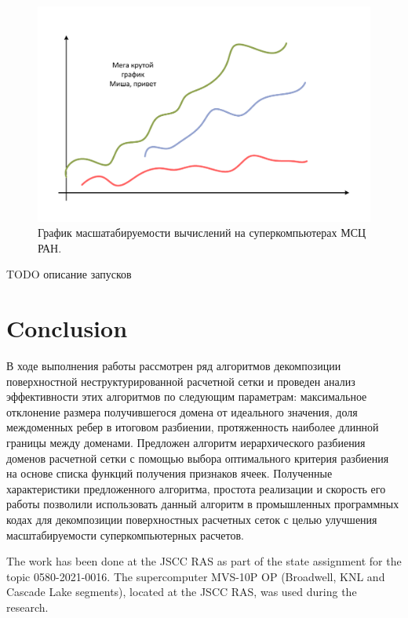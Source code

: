 \documentclass[
11pt,%
tightenlines,%
twoside,%
onecolumn,%
nofloats,%
nobibnotes,%
nofootinbib,%
superscriptaddress,%
noshowpacs,%
centertags]%
{revtex4}
\begin{document}
\begin{figure}[h]
\includegraphics[width=1.0\textwidth]{pics/05-graph.pdf}
\caption{График масшатабируемости вычислений на суперкомпьютерах МСЦ РАН.}\label{fig:05-graph}
\end{figure}

TODO описание запусков

\section{Conclusion}

В ходе выполнения работы рассмотрен ряд алгоритмов декомпозиции поверхностной неструктурированной расчетной сетки и проведен анализ эффективности этих алгоритмов по следующим параметрам: максимальное отклонение размера получившегося домена от идеального значения, доля междоменных ребер в итоговом разбиении, протяженность наиболее длинной границы между доменами. Предложен алгоритм иерархического разбиения доменов расчетной сетки с помощью выбора оптимального критерия разбиения на основе списка функций получения признаков ячеек. Полученные характеристики предложенного алгоритма, простота реализации и скорость его работы позволили использовать данный алгоритм в промышленных программных кодах для декомпозиции поверхностных расчетных сеток с целью улучшения масштабируемости суперкомпьютерных расчетов.

\begin{acknowledgments}
The work has been done at the JSCC RAS as part of the state assignment for the topic 0580-2021-0016.
The supercomputer MVS-10P OP (Broadwell, KNL and Cascade Lake segments), located at the JSCC RAS, was used during the research.
\end{acknowledgments}
\end{document}
